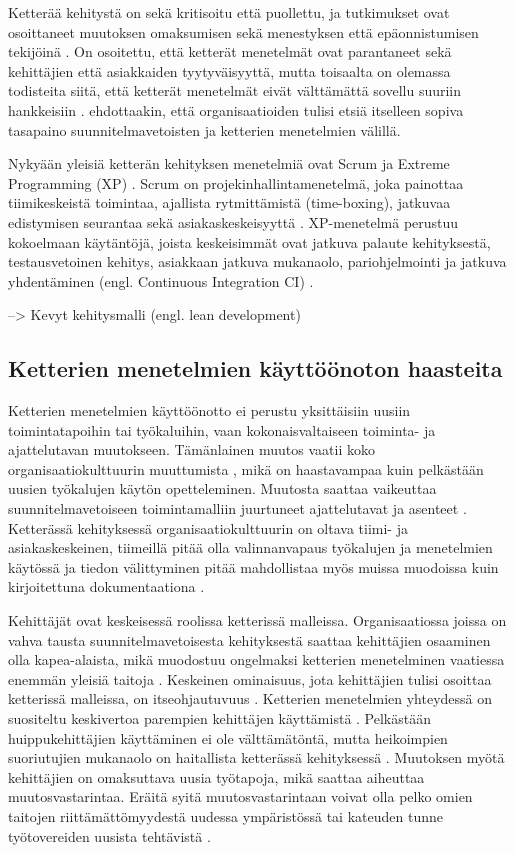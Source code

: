 Ketterää kehitystä on sekä kritisoitu että puollettu, ja tutkimukset ovat
osoittaneet muutoksen omaksumisen sekä menestyksen että epäonnistumisen
tekijöinä . On osoitettu, että ketterät menetelmät ovat
parantaneet sekä kehittäjien että asiakkaiden tyytyväisyyttä, mutta toisaalta on
olemassa todisteita siitä, että ketterät menetelmät eivät välttämättä sovellu
suuriin hankkeisiin .  ehdottaakin, että
organisaatioiden tulisi etsiä itselleen sopiva tasapaino suunnitelmavetoisten ja
ketterien menetelmien välillä.

Nykyään yleisiä ketterän kehityksen menetelmiä ovat Scrum ja Extreme Programming
(XP) . Scrum on projekinhallintamenetelmä, joka painottaa
tiimikeskeistä toimintaa, ajallista rytmittämistä (time-boxing), jatkuvaa
edistymisen seurantaa sekä asiakaskeskeisyyttä .
XP-menetelmä perustuu kokoelmaan käytäntöjä, joista keskeisimmät ovat jatkuva
palaute kehityksestä, testausvetoinen kehitys, asiakkaan jatkuva mukanaolo,
pariohjelmointi ja jatkuva yhdentäminen (engl. Continuous Integration
CI) .

--> Kevyt kehitysmalli (engl. lean development)

\subsection{Ketterien menetelmien käyttöönoton haasteita}

Ketterien menetelmien käyttöönotto ei perustu yksittäisiin uusiin
toimintatapoihin tai työkaluihin, vaan kokonaisvaltaiseen toiminta- ja
ajattelutavan muutokseen. Tämänlainen muutos vaatii koko organisaatiokulttuurin
muuttumista , mikä on haastavampaa kuin pelkästään uusien
työkalujen käytön opetteleminen. Muutosta saattaa vaikeuttaa
suunnitelmavetoiseen toimintamalliin juurtuneet ajattelutavat ja asenteet
. Ketterässä kehityksessä organisaatiokulttuurin
on oltava tiimi- ja asiakaskeskeinen, tiimeillä pitää olla valinnanvapaus
työkalujen ja menetelmien käytössä ja tiedon välittyminen pitää mahdollistaa
myös muissa muodoissa kuin kirjoitettuna dokumentaationa .

Kehittäjät ovat keskeisessä roolissa ketterissä malleissa. Organisaatiossa
joissa on vahva tausta suunnitelmavetoisesta kehityksestä saattaa kehittäjien
osaaminen olla kapea-alaista, mikä muodostuu ongelmaksi ketterien menetelminen
vaatiessa enemmän yleisiä taitoja . Keskeinen ominaisuus,
jota kehittäjien tulisi osoittaa ketterissä malleissa, on itseohjautuvuus
. Ketterien menetelmien yhteydessä on suositeltu keskivertoa
parempien kehittäjen käyttämistä . Pelkästään
huippukehittäjien käyttäminen ei ole välttämätöntä, mutta heikoimpien
suoriutujien mukanaolo on haitallista ketterässä kehityksessä
. Muutoksen myötä kehittäjien on omaksuttava uusia
työtapoja, mikä saattaa aiheuttaa muutosvastarintaa. Eräitä syitä
muutosvastarintaan voivat olla pelko omien taitojen riittämättömyydestä uudessa
ympäristössä tai kateuden tunne työtovereiden uusista tehtävistä
.

